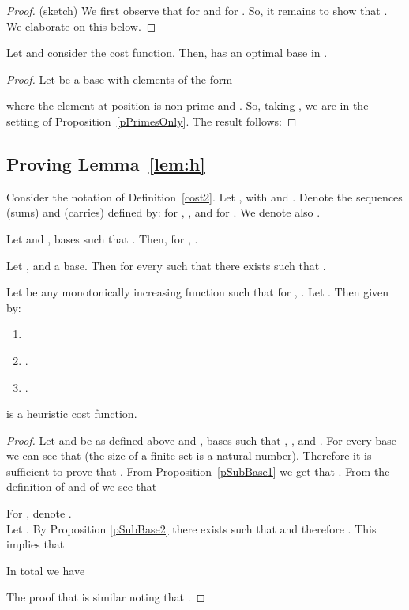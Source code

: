 \documentclass[envcountsame]{llncs}
\begin{document}
\begin{proof}(sketch)
   We first observe that 
	  for    and 
         for .
   So, it remains to show that 
	.
   We elaborate on this below.
\end{proof}



\noindent{}
Let  and consider the  cost
   function. Then,  has an optimal base in .


\begin{proof}
  Let  be a base with  elements of the form

  where the element  at position 
  is non-prime and .
So, taking , we are in the  setting of
  Proposition~\ref{pPrimesOnly}.
The result follows:
  
\end{proof}




\subsection{Proving Lemma~\ref{lem:h}}
Consider the
notation of Definition~\ref{cost2}.  Let ,
 with  and .
Denote the sequences 
(sums) and  (carries)
defined by:
 for , , and 
 for .
We denote also .


\begin{proposition}
\label{pSubBase1} 
Let  and , bases such that .
Then, for , .
\end{proposition}


\begin{proposition}
\label{pSubBase2}
Let , and  a base.  Then for every  such that  there exists  such that .
\end{proposition}

\begin{proposition}
\label{lHC}
Let  be any monotonically increasing
function such that for , .
Let . Then  given by:
\begin{enumerate}
\item 

\item 
.
\item 
.
\end{enumerate}
	is a heuristic cost function.
\end{proposition}





\begin{proof} 
  Let  and  be as defined above and ,  bases such that
  , , and .  For every base  we can
  see that  (the size of a finite set is a natural
  number).  Therefore it is sufficient to prove that .  From
  Proposition~\ref{pSubBase1} we get that
  .  From the definition of 
  and of  we see that
  
For , denote .  \\
  Let . By Proposition \ref{pSubBase2} there exists  such that  and therefore .  This implies that
  
 In total we have  

The proof that  is similar noting that .
\end{proof}
\end{document}
